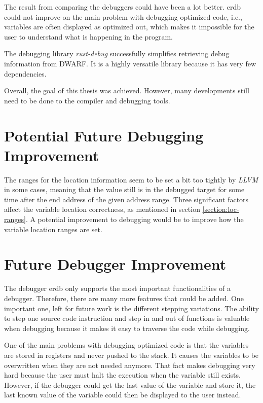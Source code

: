 


The result from comparing the debuggers could have been a lot better.
\gls{erdb} could not improve on the main problem with debugging optimized code, i.e., variables are often displayed as optimized out, which makes it impossible for the user to understand what is happening in the program.


The debugging library \emph{rust-debug} successfully simplifies retrieving debug information from \gls{DWARF}.
It is a highly versatile library because it has very few dependencies.


Overall, the goal of this thesis was achieved.
However, many developments still need to be done to the compiler and debugging tools.



\section{Potential Future Debugging Improvement}
The ranges for the location information seem to be set a bit too tightly by \emph{LLVM} in some cases, meaning that the value still is in the debugged target for some time after the end address of the given address range.
Three significant factors affect the variable location correctness, as mentioned in section \ref{section:loc-ranges}.
A potential improvement to debugging would be to improve how the variable location ranges are set.



\section{Future Debugger Improvement}
The debugger \gls{erdb} only supports the most important functionalities of a debugger.
Therefore, there are many more features that could be added.
One important one, left for future work is the different stepping variations.
The ability to step one source code instruction and step in and out of functions is valuable when debugging because it makes it easy to traverse the code while debugging.


One of the main problems with debugging optimized code is that the variables are stored in registers and never pushed to the stack.
It causes the variables to be overwritten when they are not needed anymore.
That fact makes debugging very hard because the user must halt the execution when the variable still exists.
However, if the debugger could get the last value of the variable and store it, the last known value of the variable could then be displayed to the user instead.
